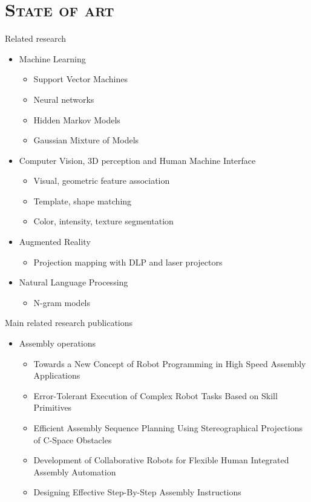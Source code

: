 \section{\scshape State of art}\label{sec:state-of-art}

\begin{frame}{Related research}
	\begin{itemize}
		\item Machine Learning
		\begin{itemize}
			\item Support Vector Machines
			\item Neural networks
			\item Hidden Markov Models
			\item Gaussian Mixture of Models
		\end{itemize}
		\item Computer Vision, 3D perception and Human Machine Interface
		\begin{itemize}
			\item Visual, geometric feature association
			\item Template, shape matching
			\item Color, intensity, texture segmentation
		\end{itemize}
		\item Augmented Reality
		\begin{itemize}
			\item Projection mapping with DLP and laser projectors
		\end{itemize}
		\item Natural Language Processing
		\begin{itemize}
			\item N-gram models
		\end{itemize}
	\end{itemize}
\end{frame}


\begin{frame}{Main related research publications}
	\begin{itemize}
		\item Assembly operations
		\begin{itemize}
			\item Towards a New Concept of Robot Programming in High Speed Assembly Applications
			\item Error-Tolerant Execution of Complex Robot Tasks Based on Skill Primitives
			\item Efficient Assembly Sequence Planning Using Stereographical Projections of C-Space Obstacles
			\item Development of Collaborative Robots for Flexible Human Integrated Assembly Automation
			\item Designing Effective Step-By-Step Assembly Instructions
		\end{itemize}
	\end{itemize}
\end{frame}

